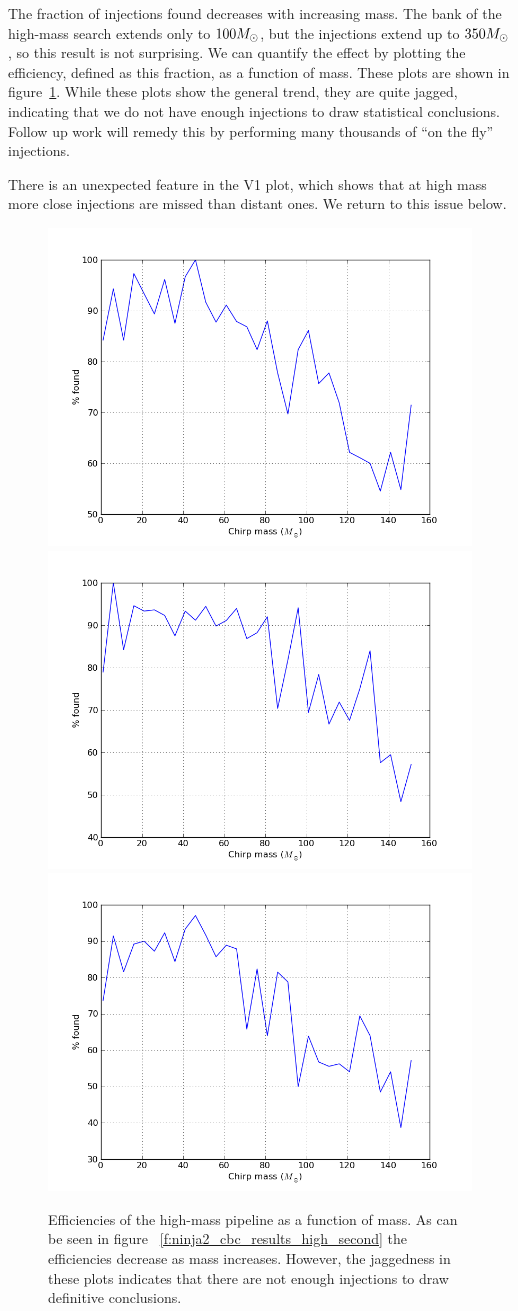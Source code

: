 The fraction of injections found decreases with increasing mass.  The
bank of the high-mass search extends only to $100 M_\odot$, but the
injections extend up to $350 M_\odot$, so this result is not surprising.
We can quantify the effect by plotting the efficiency, defined as this
fraction, as a function of mass.  These plots are shown in
figure~\ref{f:high_mass_efficiencies}.  While these plots show the
general trend, they are quite jagged, indicating that we do not have
enough injections to draw statistical conclusions.  Follow up work
will remedy this by performing many thousands of ``on the fly''
injections.

There is an unexpected feature in the V1 plot, which shows that at
high mass more close injections are missed than distant ones.  We
return to this issue below.


\begin{figure}
  \includegraphics[width=0.5\linewidth]{figures/ninja2_results/H_second_mass_high_efficiency}
  \includegraphics[width=0.5\linewidth]{figures/ninja2_results/L_second_mass_high_efficiency} \\
  \includegraphics[width=0.5\linewidth]{figures/ninja2_results/V_second_mass_high_efficiency}
  \caption[Efficiency of the high-mass pipeline as a function of mass]{
  \label{f:high_mass_efficiencies}
Efficiencies of the high-mass pipeline as a function of mass.  As
can be seen in figure ~\ref{f:ninja2_cbc_results_high_second} the
efficiencies decrease as mass increases.  However, the jaggedness in
these plots indicates that there are not enough injections to draw
definitive conclusions.
}
\end{figure}%

